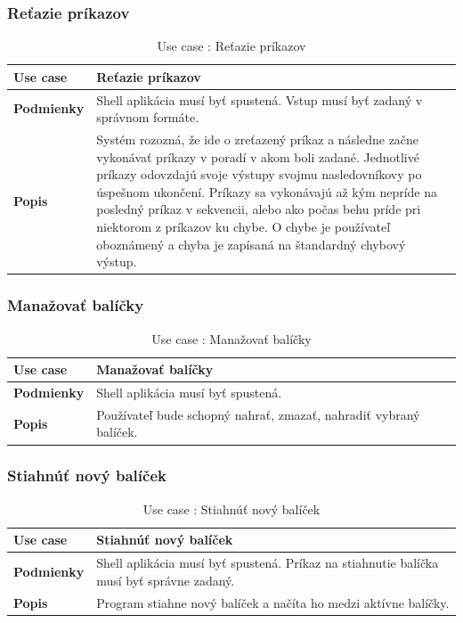 \subsubsection{Reťazie príkazov}
\begin{center}
	\begin{table}[htbp]
		\begin{tabular}{|p{2.5cm}|p{14cm}|}
			\hline
			\textbf{Use case} & Reťazie príkazov \\ 
			\hline
			\textbf{Podmienky} & Shell aplikácia musí byť spustená. Vstup musí byť zadaný v správnom formáte.\\ 
			\hline
			\textbf{Popis} & Systém rozozná, že ide o zreťazený príkaz a následne začne vykonávať príkazy v poradí v akom boli zadané. Jednotlivé príkazy odovzdajú svoje výstupy svojmu nasledovníkovy po úspešnom ukončení. Príkazy sa vykonávajú až kým nepríde na posledný príkaz v sekvencii, alebo ako počas behu príde pri niektorom z príkazov ku chybe. O chybe je používateľ oboznámený a chyba je zapísaná na štandardný chybový výstup. \\ 
			\hline
		\end{tabular}
	\label{table:1}
	\caption{Use case : Reťazie príkazov}
	\end{table}
\end{center}
\newpage

\subsubsection{Manažovať balíčky}
\begin{center}
	\begin{table}[htbp]
		\begin{tabular}{|p{2.5cm}|p{14cm}|}
			\hline
			\textbf{Use case} & Manažovať balíčky \\ 
			\hline
			\textbf{Podmienky} & Shell aplikácia musí byť spustená.\\ 
			\hline
			\textbf{Popis} & Používateľ bude schopný nahrať, zmazať, nahradiť vybraný balíček. \\ 
			\hline
		\end{tabular}
	\label{table:1}
	\caption{Use case : Manažovať balíčky}
	\end{table}
\end{center}
\subsubsection{Stiahnúť nový balíček}
\begin{center}
	\begin{table}[htbp]
		\begin{tabular}{|p{2.5cm}|p{14cm}|}
			\hline
			\textbf{Use case} & Stiahnúť nový balíček \\ 
			\hline
			\textbf{Podmienky} & Shell aplikácia musí byť spustená. Príkaz na stiahnutie balíčka musí byť správne zadaný.\\ 
			\hline
			\textbf{Popis} & Program stiahne nový balíček a načíta ho medzi aktívne balíčky. \\ 
			\hline
		\end{tabular}
		\label{table:1}
		\caption{Use case : Stiahnúť nový balíček}
	\end{table}
\end{center}
